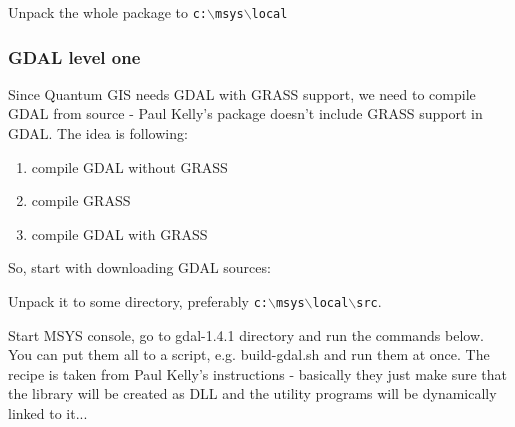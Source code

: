 Unpack the whole package to \texttt{c:$\backslash$msys$\backslash$local}

\subsubsection{GDAL level one}
Since Quantum GIS needs GDAL with GRASS support, we need to compile GDAL
from source - Paul Kelly's package doesn't include GRASS support in GDAL.
The idea is following:

\begin{enumerate}
\item compile GDAL without GRASS
\item compile GRASS
\item compile GDAL with GRASS
\end{enumerate}

So, start with downloading GDAL sources:

	\begin{quotation}
	\end{quotation}

Unpack it to some directory, preferably \texttt{c:$\backslash$msys$\backslash$local$\backslash$src}.

Start MSYS console, go to gdal-1.4.1 directory and run the commands below.
You can put them all to a script, e.g. build-gdal.sh and run them at once.
The recipe is taken from Paul Kelly's instructions - basically they
just make sure that the library will be created as DLL and the utility
programs will be dynamically linked to it...

